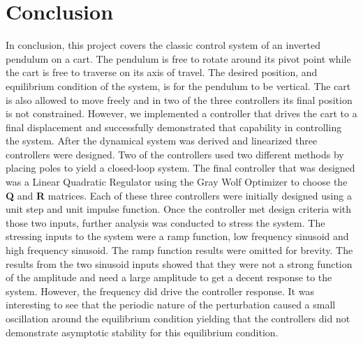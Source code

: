 \documentclass[titlepage]{article}
\begin{document}
\newpage
\section{Conclusion}
In conclusion, this project covers the classic control system of an inverted pendulum on a cart. The pendulum is free to rotate around its pivot point while the cart is free to traverse on its axis of travel. The desired position, and equilibrium condition of the system, is for the pendulum to be vertical. The cart is also allowed to move freely and in two of the three controllers its final position is not constrained. However, we implemented a controller that drives the cart to a final displacement and successfully demonstrated that capability in controlling the system. After the dynamical system was derived and linearized three controllers were designed. Two of the controllers used two different methods by placing poles to yield a closed-loop system. The final controller that was designed was a Linear Quadratic Regulator using the Gray Wolf Optimizer to choose the \textbf{Q} and \textbf{R} matrices. Each of these three controllers were initially designed using a unit step and unit impulse function. Once the controller met design criteria with those two inputs, further analysis was conducted to stress the system. The stressing inputs to the system were a ramp function, low frequency sinusoid and high frequency sinusoid. The ramp function results were omitted for brevity. The results from the two sinusoid inputs showed that they were not a strong function of the amplitude and need a large amplitude to get a decent response to the system. However, the frequency did drive the controller response. It was interesting to see that the periodic nature of the perturbation caused a small oscillation around the equilibrium condition yielding that the controllers did not demonstrate asymptotic stability for this equilibrium condition.

\newpage
\end{document}
